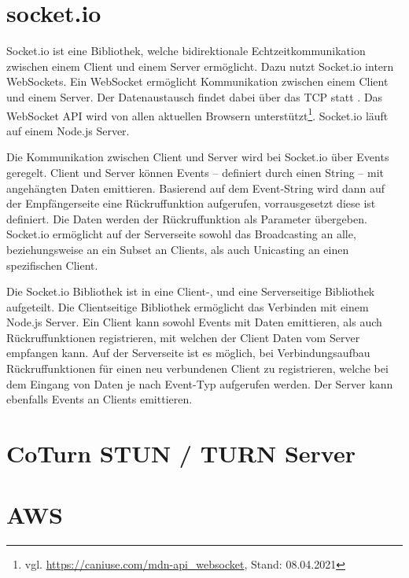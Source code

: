 \section{socket.io}
Socket.io ist eine Bibliothek, welche bidirektionale Echtzeitkommunikation zwischen einem Client und einem Server ermöglicht. Dazu nutzt Socket.io intern WebSockets\cite{socketio}. Ein WebSocket ermöglicht Kommunikation zwischen einem Client und einem Server. Der Datenaustausch findet dabei über das \ac{TCP} statt \cite{websocketRFC}. Das WebSocket \ac{API} wird von allen aktuellen Browsern unterstützt\footnote{vgl. \url{https://caniuse.com/mdn-api_websocket}, Stand: 08.04.2021}. Socket.io läuft auf einem Node.js Server\cite{socketio}.\par

Die Kommunikation zwischen Client und Server wird bei Socket.io über Events geregelt. Client und Server können Events -- definiert durch einen String -- mit angehängten Daten emittieren. Basierend auf dem Event-String wird dann auf der Empfängerseite eine Rückruffunktion aufgerufen, vorrausgesetzt diese ist definiert. Die Daten werden der Rückruffunktion als Parameter übergeben. Socket.io ermöglicht auf der Serverseite sowohl das Broadcasting an alle, beziehungsweise an ein Subset an Clients, als auch Unicasting an einen spezifischen Client.\par

Die Socket.io Bibliothek ist in eine Client-, und eine Serverseitige Bibliothek aufgeteilt. Die Clientseitige Bibliothek ermöglicht das Verbinden mit einem Node.js Server. Ein Client kann sowohl Events mit Daten emittieren, als auch Rückruffunktionen registrieren, mit welchen der Client Daten vom Server empfangen kann. Auf der Serverseite ist es möglich, bei Verbindungsaufbau Rückruffunktionen für einen neu verbundenen Client zu registrieren, welche bei dem Eingang von Daten je nach Event-Typ aufgerufen werden. Der Server kann ebenfalls Events an Clients emittieren.

\section{CoTurn STUN / TURN Server}

\section{AWS}